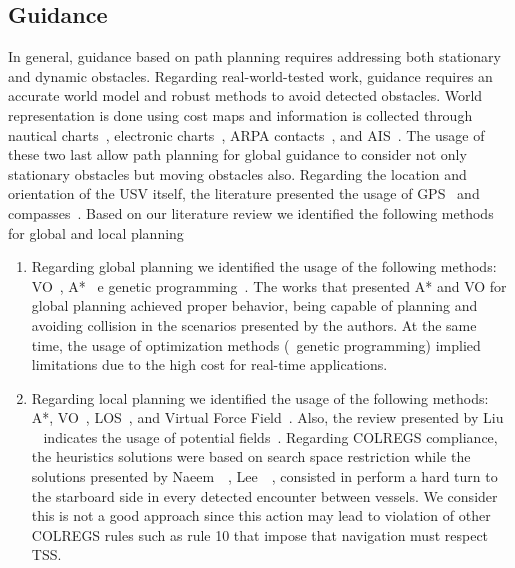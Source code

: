     
    \subsection{Guidance}
    
    In general, guidance based on path planning requires addressing both stationary and dynamic obstacles. Regarding real-world-tested work, guidance requires an accurate world model and robust methods to avoid detected obstacles. World representation is done using cost maps and information is collected through nautical charts~\cite{Larson2006Autonomous}, electronic charts~\cite{Naus2013Idea}, \ac{ARPA} contacts~\cite{Larson2006Autonomous}, and \ac{AIS}~\cite{Abdelaal2017NMPC}. The usage of these two last allow path planning for global guidance to consider not only stationary obstacles but moving obstacles also. Regarding the location and orientation of the \ac{USV} itself, the literature presented the usage of GPS~\cite{Benjamin2004COLREGS} and compasses~\cite{Annamalai2013Comparison}. Based on our literature review we identified the following methods for global and local planning
    
    \begin{enumerate}
    
        \item Regarding global planning we identified the usage of the following methods: \ac{VO}~\cite{Larson2006Autonomous, Kuwata2014Safe, Zhuang2011Motion, Huang2019Generalized}, A*~\cite{Naeem2012COLREGS, Campbell2012Review_COLREGs, Naus2013Idea} e genetic programming~\cite{Svec2012Automated, Svec2011aAutomated}. The works that presented A* and VO for global planning achieved proper behavior, being capable of planning and avoiding collision in the scenarios presented by the authors. At the same time, the usage of optimization methods (\ie~genetic programming) implied limitations due to the high cost for real-time applications. 
        
        \item Regarding local planning we identified the usage of the following methods: A*\cite{Larson2006Autonomous, Campbell2013Automatic, Agrawal2015COLREGS}, \ac{VO}~\cite{Larson2006Autonomous, Huang2019Generalized}, \ac{LOS}~\cite{Naeem2012COLREGS}, and Virtual Force Field~\cite{Lee2004Fuzzy}. Also, the review presented by Liu \etal~\cite{Liu2016Unmanned} indicates the usage of potential fields~\cite{Healey2007Collaborative, Soltan2009Trajectory}. Regarding \ac{COLREGS} compliance, the heuristics solutions were based on search space restriction while the solutions presented by  Naeem~\etal~\cite{Naeem2012COLREGS}, Lee~\etal~\cite{Lee2004Fuzzy}, consisted in perform a hard turn to the starboard side in every detected encounter between vessels. We consider this is not a good approach since this action may lead to violation of other \ac{COLREGS} rules such as rule 10 that impose that navigation must respect \acf{TSS}.
        
    \end{enumerate}
    
